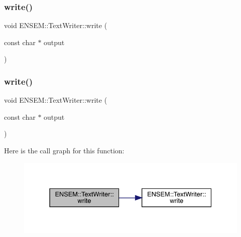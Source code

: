 \mbox{\label{classENSEM_1_1TextWriter_ae8a8946f8f52884017f52cd69f809ba2}} 
\subsubsection{\texorpdfstring{write()}{write()}\hspace{0.1cm}{\footnotesize\ttfamily [5/36]}}
{\footnotesize\ttfamily void E\+N\+S\+E\+M\+::\+Text\+Writer\+::write (\begin{DoxyParamCaption}\item[{const char $\ast$}]{output }\end{DoxyParamCaption})}

\mbox{\label{classENSEM_1_1TextWriter_ae8a8946f8f52884017f52cd69f809ba2}} 
\subsubsection{\texorpdfstring{write()}{write()}\hspace{0.1cm}{\footnotesize\ttfamily [6/36]}}
{\footnotesize\ttfamily void E\+N\+S\+E\+M\+::\+Text\+Writer\+::write (\begin{DoxyParamCaption}\item[{const char $\ast$}]{output }\end{DoxyParamCaption})}

Here is the call graph for this function\+:
\nopagebreak
\begin{figure}[H]
\begin{center}
\leavevmode
\includegraphics[width=331pt]{db/d53/classENSEM_1_1TextWriter_ae8a8946f8f52884017f52cd69f809ba2_cgraph}
\end{center}
\end{figure}
\mbox{\label{classENSEM_1_1TextWriter_aef9f6c18d6d6995fadc116b65e58b35a}} 
